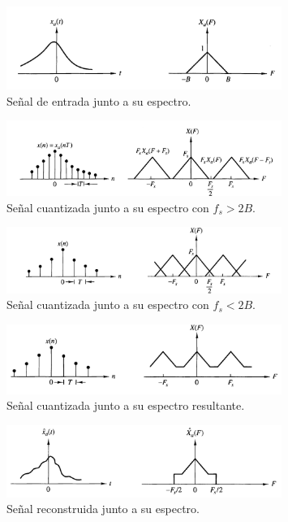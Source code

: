\begin{figure}[H]
	\centering
	\includegraphics[width=0.8\textwidth]{ImagenesEjercicio2/aliassignal.PNG}
\caption{Señal de entrada junto a su espectro.}
	\label{fig:aliassingal}
\end{figure}
\begin{figure}[H]
	\centering
	\includegraphics[width=0.8\textwidth]{ImagenesEjercicio2/aliasquatum.PNG}
\caption{Señal cuantizada junto a su espectro con $f_s > 2B$.}
	\label{fig:aliasquantum}
\end{figure}
\begin{figure}[H]
	\centering
	\includegraphics[width=0.8\textwidth]{ImagenesEjercicio2/alias3.PNG}
\caption{Señal cuantizada junto a su espectro con $f_s < 2B$.}
	\label{fig:alias3}
\end{figure}
\begin{figure}[H]
	\centering
	\includegraphics[width=0.8\textwidth]{ImagenesEjercicio2/alias4.PNG}
\caption{Señal cuantizada junto a su espectro resultante.}
	\label{fig:alias4}
\end{figure}
\begin{figure}[H]
	\centering
	\includegraphics[width=0.8\textwidth]{ImagenesEjercicio2/aliasfin.PNG}
\caption{Señal reconstruida junto a su espectro.}
	\label{fig:aliasfin}
\end{figure}

